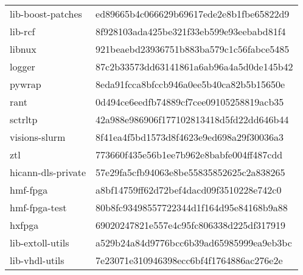 \documentclass[10.5pt,a4paper,DIV=15]{scrartcl}
\renewcommand\footnote[1]{}
\begin{document}
\begin{table}[H]
\begin{tabular}{l >{\ttfamily}l}
lib-boost-patches\footnote{\url{https://github.com/electronicvisions/lib-boost-patches}} & ed89665b4c066629b69617ede2e8b1fbe65822d9 \\

lib-rcf\footnote{\url{https://github.com/electronicvisions/lib-rcf}} & 8f928103ada425be321f33eb599e93eebabd81f4 \\

libnux\footnote{\url{https://github.com/electronicvisions/libnux}} & 921beaebd23936751b883ba579c1c56fabce5485 \\

logger\footnote{\url{https://github.com/electronicvisions/logger}} & 87c2b33573dd63141861a6ab96a4a5d0de145b42 \\

pywrap\footnote{\url{https://github.com/electronicvisions/pywrap}} & 8eda91fcca8bfccb946a0ee5b40ca82b5b15650e \\

rant\footnote{\url{https://github.com/electronicvisions/rant}} & 0d494ce6eedfb74889cf7cee09105258819acb35 \\

sctrltp\footnote{\url{https://github.com/electronicvisions/sctrltp}} & 42a988e986906f177102813418d5fd22dd646b44 \\

visions-slurm\footnote{\url{https://github.com/electronicvisions/visions-slurm}} & 8f41ea4f5bd1573d8f4623e9ed698a29f30036a3 \\

ztl\footnote{\url{https://github.com/electronicvisions/ztl}} & 773660f435e56b1ee7b962e8babfe004ff487cdd \\

hicann-dls-private & 57e29fa5cfb94063e8be55835852625c2a838265 \\

hmf-fpga & a8bf14759ff62d72bef4dacd09f3510228e742c0 \\

hmf-fpga-test & 80b8fc93498557722344d1f164d95e84168b9a88 \\

hxfpga & 69020247821e557e4c95fc806338d225df317919 \\

lib-extoll-utils & a529b24a84d9776bcc6b39ad65985999ea9eb3bc \\

lib-vhdl-utils & 7e23071e310946398ecc6bf4f1764886ac276e2e \\


\end{tabular}
\end{table}
\end{document}
